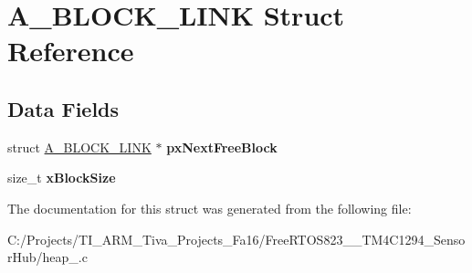 \hypertarget{struct_a___b_l_o_c_k___l_i_n_k}{}\section{A\+\_\+\+B\+L\+O\+C\+K\+\_\+\+L\+I\+N\+K Struct Reference}
\label{struct_a___b_l_o_c_k___l_i_n_k}
\subsection*{Data Fields}
\begin{DoxyCompactItemize}
\item 
\hypertarget{struct_a___b_l_o_c_k___l_i_n_k_ae48282896c5b0af5cb25f914f3c1c936}{}struct \hyperlink{struct_a___b_l_o_c_k___l_i_n_k}{A\+\_\+\+B\+L\+O\+C\+K\+\_\+\+L\+I\+N\+K} $\ast$ {\bfseries px\+Next\+Free\+Block}\label{struct_a___b_l_o_c_k___l_i_n_k_ae48282896c5b0af5cb25f914f3c1c936}

\item 
\hypertarget{struct_a___b_l_o_c_k___l_i_n_k_a130b4f85ad4cc46ca0f3d36001769696}{}size\+\_\+t {\bfseries x\+Block\+Size}\label{struct_a___b_l_o_c_k___l_i_n_k_a130b4f85ad4cc46ca0f3d36001769696}

\end{DoxyCompactItemize}


The documentation for this struct was generated from the following file\+:\begin{DoxyCompactItemize}
\item 
C\+:/\+Projects/\+T\+I\+\_\+\+A\+R\+M\+\_\+\+Tiva\+\_\+\+Projects\+\_\+\+Fa16/\+Free\+R\+T\+O\+S823\+\_\+\_\+\+T\+M4\+C1294\+\_\+\+Sensor\+Hub/heap\+\_.\+c\end{DoxyCompactItemize}
